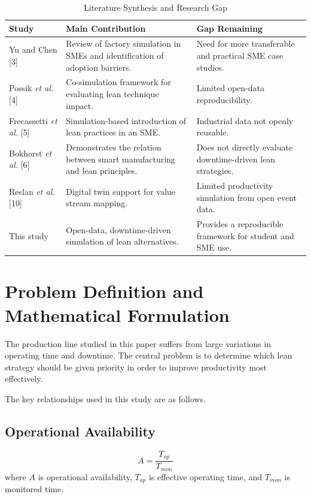 \documentclass[12pt,a4paper]{article}
\begin{document}
\begin{table}[H]
\centering
\caption{Literature Synthesis and Research Gap}
\begin{tabular}{p{3.0cm}p{6.3cm}p{4.1cm}}
\toprule
\textbf{Study} & \textbf{Main Contribution} & \textbf{Gap Remaining} \\
\midrule
Yu and Chen [3] & Review of factory simulation in SMEs and identification of adoption barriers. & Need for more transferable and practical SME case studies. \\
Possik \emph{et al.} [4] & Co-simulation framework for evaluating lean technique impact. & Limited open-data reproducibility. \\
Frecassetti \emph{et al.} [5] & Simulation-based introduction of lean practices in an SME. & Industrial data not openly reusable. \\
Bokhorst \emph{et al.} [6] & Demonstrates the relation between smart manufacturing and lean principles. & Does not directly evaluate downtime-driven lean strategies. \\
Reslan \emph{et al.} [10] & Digital twin support for value stream mapping. & Limited productivity simulation from open event data. \\
This study & Open-data, downtime-driven simulation of lean alternatives. & Provides a reproducible framework for student and SME use. \\
\bottomrule
\end{tabular}
\end{table}

\section{Problem Definition and Mathematical Formulation}
The production line studied in this paper suffers from large variations in operating time and downtime. The central problem is to determine which lean strategy should be given priority in order to improve productivity most effectively.

The key relationships used in this study are as follows.

\subsection{Operational Availability}
\begin{equation}
A = \frac{T_{op}}{T_{mon}}
\end{equation}
where $A$ is operational availability, $T_{op}$ is effective operating time, and $T_{mon}$ is monitored time.
\end{document}
